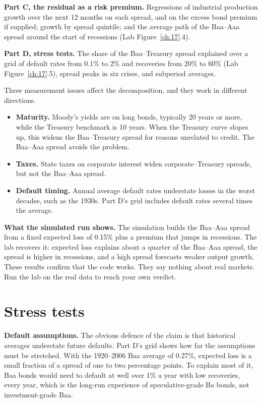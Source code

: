 \textbf{Part C, the residual as a risk premium.} Regressions of industrial production growth over the next 12 months on each spread, and on the excess bond premium if supplied; growth by spread quintile; and the average path of the Baa--Aaa spread around the start of recessions (Lab Figure~\ref{ch:17}.4).

\textbf{Part D, stress tests.} The share of the Baa--Treasury spread explained over a grid of default rates from 0.1\% to 2\% and recoveries from 20\% to 60\% (Lab Figure~\ref{ch:17}.5), spread peaks in six crises, and subperiod averages.

Three measurement issues affect the decomposition, and they work in different directions.

\begin{itemize}
  \item \textbf{Maturity.} Moody's yields are on long bonds, typically 20 years or more, while the Treasury benchmark is 10 years. When the Treasury curve slopes up, this widens the Baa--Treasury spread for reasons unrelated to credit. The Baa--Aaa spread avoids the problem.
  \item \textbf{Taxes.} State taxes on corporate interest widen corporate--Treasury spreads, but not the Baa--Aaa spread.
  \item \textbf{Default timing.} Annual average default rates understate losses in the worst decades, such as the 1930s. Part D's grid includes default rates several times the average.
\end{itemize}

\textbf{What the simulated run shows.} The simulation builds the Baa--Aaa spread from a fixed expected loss of 0.15\% plus a premium that jumps in recessions. The lab recovers it: expected loss explains about a quarter of the Baa--Aaa spread, the spread is higher in recessions, and a high spread forecasts weaker output growth. These results confirm that the code works. They say nothing about real markets. Run the lab on the real data to reach your own verdict.

\section{Stress tests}
\label{sec:17-stress}

\textbf{Default assumptions.} The obvious defence of the claim is that historical averages understate future defaults. Part D's grid shows how far the assumptions must be stretched. With the 1920--2006 Baa average of 0.27\%, expected loss is a small fraction of a spread of one to two percentage points. To explain most of it, Baa bonds would need to default at well over 1\% a year with low recoveries, every year, which is the long-run experience of speculative-grade Ba bonds, not investment-grade Baa.

